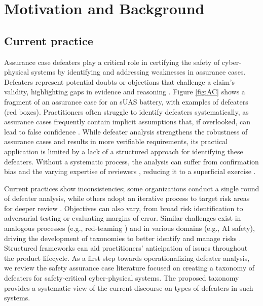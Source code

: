 \section{Motivation and Background}
\label{sec:background}
\subsection{Current practice}

Assurance case defeaters play a critical role in certifying the safety of cyber-physical systems by identifying and addressing weaknesses in assurance cases. Defeaters represent potential doubts or objections that challenge a claim's validity, highlighting gaps in evidence and reasoning \cite{murugesan2023semantic}. Figure \ref{fig:AC} shows a fragment of an assurance case for an sUAS battery, with examples of defeaters (red boxes). Practitioners often struggle to identify defeaters systematically, as assurance cases frequently contain implicit assumptions that, if overlooked, can lead to false confidence \cite{greenwell2006taxonomy,gohar2024codefeater}. While defeater analysis strengthens the robustness of assurance cases and results in more verifiable requirements, its practical application is limited by a lack of a structured approach for identifying these defeaters. Without a systematic process, the analysis can suffer from confirmation bias and the varying expertise of reviewers \cite{maksimov2019survey,10311213}, reducing it to a superficial exercise \cite{greenwell2006taxonomy,hobbs2024driving}.

Current practices show inconsistencies; some organizations conduct a single round of defeater analysis, while others adopt an iterative process %
to target risk areas for deeper review \cite{millet2023assurance,gohar2024codefeater}. Objectives can also vary, from broad risk identification to adversarial testing or evaluating margins of error. Similar challenges exist in analogous processes (e.g., red-teaming \cite{feffer2024red}) and in various domains (e.g., AI safety), driving the development of taxonomies to better identify and manage risks \cite{ramirez2012taxonomy,mohseni2022taxonomy}.
Structured frameworks can aid practitioners’ anticipation of issues throughout the product lifecycle. As a first step towards operationalizing defeater analysis, we review the safety assurance case literature focused on creating a taxonomy of defeaters for safety-critical cyber-physical systems. The proposed taxonomy provides a systematic view of the current discourse on types of defeaters in such systems.

